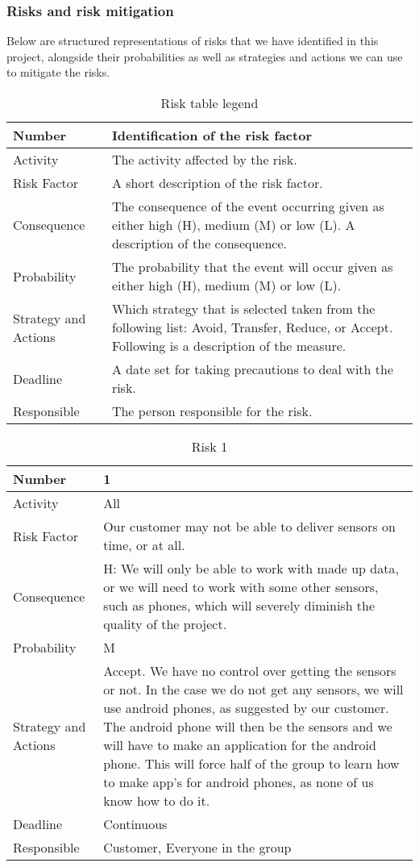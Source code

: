 \documentclass[../document.tex]{subfiles}
\begin{document}
\subsubsection{Risks and risk mitigation}
\label{risks_and_risk_mitigation}
Below are structured representations of risks that we have identified in this project, alongside their probabilities as well as strategies and actions we can use to mitigate the risks.

\begin{table}[H]
\caption{Risk table legend}
\begin{tabularx}{\textwidth}{|l|X|}
\hline
Number
&Identification of the risk factor
\\ \hline Activity
&The activity affected by the risk.
\\ \hline Risk Factor
&A short description of the risk factor.
\\ \hline Consequence
&The consequence of the event occurring given as either high (H), medium (M) or low (L). A description of the consequence.
\\ \hline Probability
&The probability that the event will occur given as either high (H), medium (M) or low (L).
\\ \hline Strategy and Actions
&Which strategy that is selected taken from the following list: Avoid, Transfer, Reduce, or Accept. Following is a description of the measure.
\\ \hline Deadline
&A date set for taking precautions to deal with the risk.
\\ \hline Responsible
&The person responsible for the risk.
\\ \hline
\end{tabularx}
\end{table}

\begin{table}[H]
\caption{Risk 1}
\begin{tabularx}{\textwidth}{|l|X|}
\hline
Number
&1
\\ \hline Activity
&All
\\ \hline Risk Factor
&Our customer may not be able to deliver sensors on time, or at all.
\\ \hline Consequence
&H: We will only be able to work with made up data, or we will need to work with some other sensors, such as phones, which will severely diminish the quality of the project.
\\ \hline Probability
&M
\\ \hline Strategy and Actions
&Accept. We have no control over getting the sensors or not. In the case we do not get any sensors, we will use android phones, as suggested by our customer. The android phone will then be the sensors and we will have to make an application for the android phone. This will force half of the group to learn how to make app’s for android phones, as none of us know how to do it.
\\ \hline Deadline
&Continuous
\\ \hline Responsible
&Customer, Everyone in the group
\\ \hline 
\end{tabularx}
\end{table}
\end{document}
